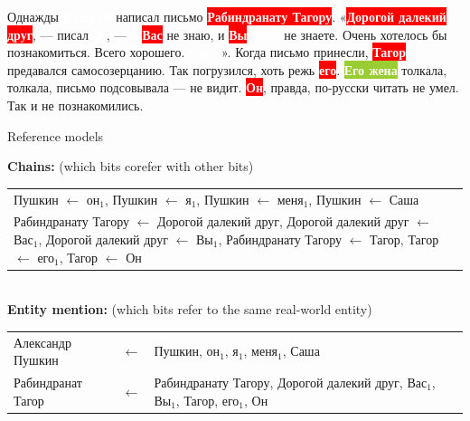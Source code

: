 \documentclass[dvipsnames, 10pt, compress]{beamer}
\newcommand{\redfillbox}[1]{\colorbox{red}{\textcolor{white}{{\bf #1}}}}
\newcommand{\bluefillbox}[1]{\colorbox{ProcessBlue}{\textcolor{white}{{\bf #1}}}}
\newcommand{\greenfillbox}[1]{\colorbox{YellowGreen}{\textcolor{white}{{\bf #1}}}}
\begin{document}
\begin{frame}

Однажды \bluefillbox{Пушкин} написал письмо \redfillbox{Рабиндранату Тагору}. 
«\redfillbox{Дорогой далекий друг}, — писал \bluefillbox{он}, — \bluefillbox{я} \redfillbox{Вас} не знаю, и \redfillbox{Вы} \bluefillbox{меня} не знаете. Очень хотелось бы познакомиться. Всего хорошего. \bluefillbox{Саша}».
Когда письмо принесли, \redfillbox{Тагор} предавался самосозерцанию. 
Так погрузился, хоть режь \redfillbox{его}. 
\greenfillbox{Его жена} толкала, толкала, письмо подсовывала — не видит. 
\redfillbox{Он}, правда, по-русски читать не умел. Так и не познакомились.

\end{frame}


\begin{frame}{Reference models}


\textbf{Chains:} (which bits corefer with other bits)\\
\begin{tabular}{p{}}
Пушкин $\leftarrow$ он$_1$, Пушкин $\leftarrow$ я$_1$, Пушкин $\leftarrow$ меня$_1$, Пушкин $\leftarrow$ Саша \\
Рабиндранату Тагору $\leftarrow$ Дорогой далекий друг, Дорогой далекий друг $\leftarrow$ Вас$_1$, Дорогой далекий друг $\leftarrow$ Вы$_1$, Рабиндранату Тагору $\leftarrow$ Тагор, Тагор $\leftarrow$ его$_1$, Тагор $\leftarrow$ Он \\
\end{tabular}

~\\

\textbf{Entity mention:} (which bits refer to the same real-world entity)\\
\begin{tabular}{lcp{}}
Александр Пушкин & $\leftarrow$  & Пушкин, он$_1$, я$_1$, меня$_1$, Саша  \\
Рабиндранат Тагор & $\leftarrow$ & Рабиндранату Тагору, Дорогой далекий друг, Вас$_1$, Вы$_1$, Тагор, его$_1$, Он \\ 
\end{tabular}

\end{frame}
\end{document}
